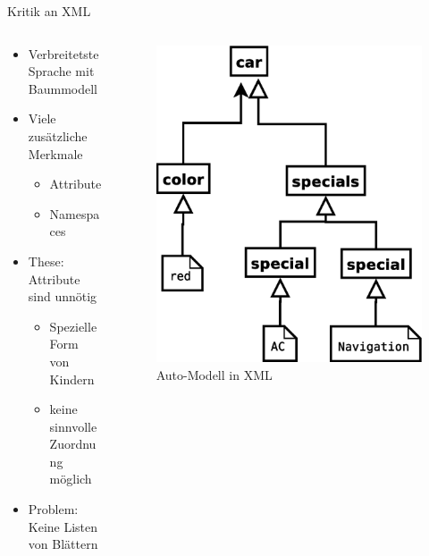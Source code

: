 \documentclass{beamer}
\begin{document}
\begin{frame}{Kritik an XML}
  \begin{columns}
    \begin{column}{6cm}
      \begin{itemize}
      \item Verbreitetste Sprache mit Baummodell
      \item Viele zusätzliche Merkmale
        \begin{itemize}
        \item Attribute
        \item Namespaces
        \end{itemize}
      \item These: Attribute sind unnötig
        \begin{itemize}
        \item Spezielle Form von Kindern
        \item keine sinnvolle Zuordnung möglich
        \end{itemize}
      \item Problem: Keine Listen von Blättern
      \end{itemize}
    \end{column}
    \begin{column}{4cm}
      \begin{figure}
        \centering
        \includegraphics[scale=0.3]{images/car_xml}
        \caption{Auto-Modell in XML}
      \end{figure}    
    \end{column}
  \end{columns}
\end{frame}
\end{document}

